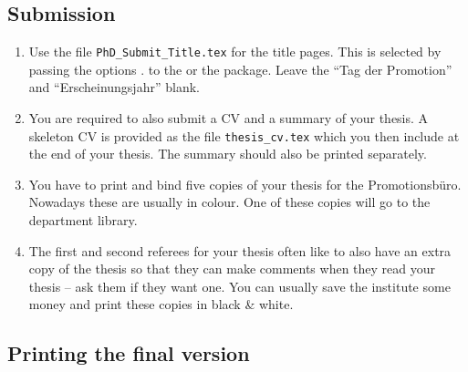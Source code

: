 \subsection{Submission}

\begin{enumerate}
\item Use the file \texttt{PhD\_Submit\_Title.tex} for the title
  pages. 
  This is selected by passing the options .
  to the  or the  package.
  Leave the \foreignquote{ngerman}{Tag der Promotion} and
  \foreignquote{ngerman}{Erscheinungsjahr} blank.
\item You are required to also submit a CV and a summary of your
  thesis. A skeleton CV is provided as the file
  \texttt{thesis\_cv.tex} which you then include at the end of your
  thesis. The summary should also be printed separately.
\item You have to print and bind five copies of your thesis for the
  \foreignlanguage{ngerman}{Promotionsbüro}. Nowadays these are
  usually in colour.
  One of these copies will go to the department library.
\item The first and second referees for your thesis often like to also
  have an extra copy of the thesis so that they can make comments when they read
  your thesis -- ask them if they want one. You can usually save the
  institute some money and print these copies in black \& white.
\end{enumerate}


\subsection{Printing the final version}

